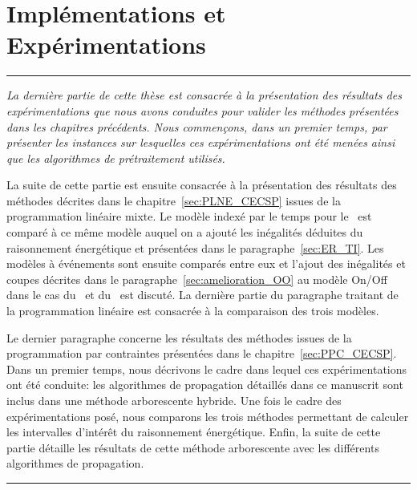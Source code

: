 \cleardoublepage
\begin{minipage}{0.95\linewidth}

\part{Implémentations et Expérimentations}
\label{sec:expe}
\vspace{15mm} %
\parttoc 
\end{minipage}
\newpage
\thispagestyle{empty}
\begin{center}
  \begin{minipage}{\textwidth}
    \hrule
    \vspace{0.5cm}
    {\it  La dernière partie de cette thèse est consacrée à la
      présentation des résultats des expérimentations que nous avons
      conduites pour valider les méthodes présentées dans les
      chapitres précédents. Nous commençons, dans un premier temps,
      par présenter les instances sur lesquelles ces expérimentations
      ont été menées ainsi que les algorithmes de prétraitement
      utilisés. 

   La suite de cette partie est ensuite consacrée à la présentation
   des résultats des méthodes décrites dans le
   chapitre~\ref{sec:PLNE_CECSP} issues de la programmation linéaire
   mixte. Le modèle indexé par le temps pour le \CECSP~est comparé à
   ce même modèle auquel on a ajouté les inégalités déduites du
   raisonnement énergétique et présentées dans le
   paragraphe~\ref{sec:ER_TI}. Les modèles à événements sont ensuite
   comparés entre eux et l'ajout des inégalités et coupes décrites
   dans le paragraphe~\ref{sec:amelioration_OO} au modèle On/Off dans le cas du \CECSP~et
   du \RCPSP~est discuté. La dernière  partie  du paragraphe traitant
   de la programmation linéaire est  consacrée à la comparaison des
   trois modèles.  

   Le dernier paragraphe concerne les résultats des méthodes issues de
   la programmation par contraintes présentées dans le
   chapitre~\ref{sec:PPC_CECSP}. Dans un premier temps, nous
   décrivons le cadre dans lequel ces expérimentations ont été
   conduite: les algorithmes de propagation détaillés dans ce manuscrit
   sont inclus dans une méthode arborescente hybride. Une fois le cadre
   des expérimentations posé, nous comparons les trois méthodes permettant
   de calculer les intervalles d'intérêt du raisonnement
   énergétique. Enfin, la suite de cette partie détaille les résultats de
   cette méthode arborescente avec les différents algorithmes de
   propagation. }
    \vspace{0.5cm}
    \hrule
  \end{minipage}
\end{center}

